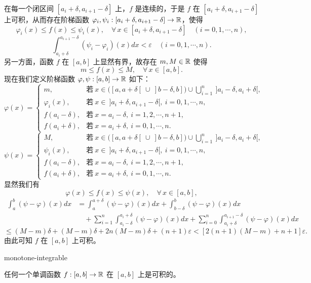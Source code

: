 在每一个闭区间 \([a_i+\delta,a_{i+1}-\delta]\) 上，\(f\) 是连续的，于是 \(f\) 在 \([a_i+\delta,a_{i+1}-\delta]\) 上可积，从而存在阶梯函数 \(\varphi_i,\psi_i:[a_i+\delta,a_{i+1}-\delta]\to\mathbb{R}\)，使得
\[
\varphi_i(x)\le f(x)\le\psi_i(x),\quad\forall\,x\in[a_i+\delta,a_{i+1}-\delta]\quad(i=0,1,\cdots,n),
\]
\[
\int_{a_i+\delta}^{a_{i+1}-\delta}(\psi_i-\varphi_i)(x)dx<\varepsilon\quad(i=0,1,\cdots,n).
\]
另一方面，函数 \(f\) 在 \([a,b]\) 上显然有界，故存在 \(m,M\in\mathbb{R}\) 使得
\[
m\le f(x)\le M,\quad\forall\,x\in[a,b].
\]
现在我们定义阶梯函数 \(\varphi,\psi:[a,b]\to\mathbb{R}\) 如下：
\[
\varphi(x)=\begin{cases}
m, & \text{若}\ x\in\bigl([a,a+\delta[\ \cup\ ]b-\delta,b]\bigr)\cup\bigcup_{i=1}^n\ ]a_i-\delta,a_i+\delta[, \\
\varphi_i(x), & \text{若}\ x\in\ ]a_i+\delta,a_{i+1}-\delta[,\ i=0,1,\cdots,n, \\
f(a_i-\delta), & \text{若}\ x=a_i-\delta,\ i=1,2,\cdots,n+1, \\
f(a_i+\delta), & \text{若}\ x=a_i+\delta,\ i=0,1,\cdots,n.
\end{cases}
\]
\[
\psi(x)=\begin{cases}
M, & \text{若}\ x\in\bigl([a,a+\delta[\ \cup\ ]b-\delta,b]\bigr)\cup\bigcup_{i=1}^n\ ]a_i-\delta,a_i+\delta[, \\
\psi_i(x), & \text{若}\ x\in\ ]a_i+\delta,a_{i+1}-\delta[,\ i=0,1,\cdots,n, \\
f(a_i-\delta), & \text{若}\ x=a_i-\delta,\ i=1,2,\cdots,n+1, \\
f(a_i+\delta), & \text{若}\ x=a_i+\delta,\ i=0,1,\cdots,n.
\end{cases}
\]
显然我们有
\[
\varphi(x)\le f(x)\le\psi(x),\quad\forall\,x\in[a,b],
\]
\[
\begin{aligned}
\int_a^b(\psi-\varphi)(x)dx
&=\int_a^{a+\delta}(\psi-\varphi)(x)dx+\int_{b-\delta}^b(\psi-\varphi)(x)dx\\
&\quad+\sum_{i=1}^n\int_{a_i-\delta}^{a_i+\delta}(\psi-\varphi)(x)dx+\sum_{i=0}^n\int_{a_i+\delta}^{a_{i+1}-\delta}(\psi-\varphi)(x)dx
\end{aligned}
\]
\[
\le(M-m)\delta+(M-m)\delta+2n(M-m)\delta+(n+1)\varepsilon<[2(n+1)(M-m)+n+1]\varepsilon.
\]
由此可知 \(f\) 在 \([a,b]\) 上可积。

\begin{mythm}{}{monotone-integrable}

	任何一个单调函数 \(f:[a,b]\to\mathbb{R}\) 在 \([a,b]\) 上是可积的。

\end{mythm}

